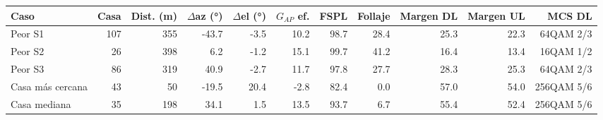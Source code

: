 \begin{tabular}{lrrrrrrrrrr}\toprule Caso & Casa & Dist. (m) & $\Delta$az (°) & $\Delta$el (°) & $G_{AP}$ ef. & FSPL & Follaje & Margen DL & Margen UL & MCS DL \\\midrule
Peor S1 & 107 & 355 & -43.7 & -3.5 & 10.2 & 98.7 & 28.4 & 25.3 & 22.3 & 64QAM 2/3\\
Peor S2 & 26 & 398 & 6.2 & -1.2 & 15.1 & 99.7 & 41.2 & 16.4 & 13.4 & 16QAM 1/2\\
Peor S3 & 86 & 319 & 40.9 & -2.7 & 11.7 & 97.8 & 27.7 & 28.3 & 25.3 & 64QAM 2/3\\
Casa más cercana & 43 & 50 & -19.5 & 20.4 & -2.8 & 82.4 & 0.0 & 57.0 & 54.0 & 256QAM 5/6\\
Casa mediana & 35 & 198 & 34.1 & 1.5 & 13.5 & 93.7 & 6.7 & 55.4 & 52.4 & 256QAM 5/6\\
\bottomrule\end{tabular}
